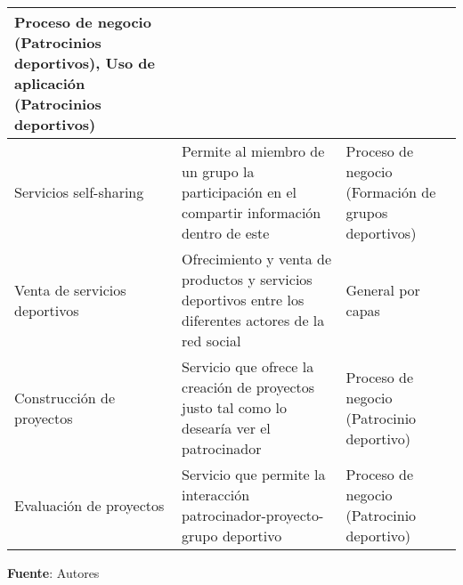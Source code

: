\begin{center}
\begin{longtable}{|p{4cm}|p{7cm}|p{4cm}|}
		Proceso de negocio (Patrocinios deportivos), Uso de aplicación (Patrocinios deportivos)
		\\
		\hline
		Servicios self-sharing & 
		Permite al miembro de un grupo la participación en el compartir información dentro de este & 
		Proceso de negocio (Formación de grupos deportivos)
		\\
		\hline
		Venta de servicios deportivos & 
		Ofrecimiento y venta de productos y servicios deportivos entre los diferentes actores de la red social & 
		General por capas
		\\
		\hline
		Construcción de proyectos & 
		Servicio que ofrece la creación de proyectos justo tal como lo desearía ver el patrocinador & 
		Proceso de negocio (Patrocinio deportivo)
		\\
		\hline
		Evaluación de proyectos & 
		Servicio que permite la interacción patrocinador-proyecto-grupo deportivo & 
		Proceso de negocio (Patrocinio deportivo)
		\\
		\hline
	\end{longtable}
	\textbf{Fuente}: Autores
\end{center}

